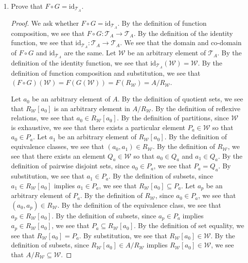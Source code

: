 \documentclass{amsart}
\newcommand{\id}[1]{\mathrm{id}_{#1}}
\newcommand{\W}{\mathcal{W}}
\newcommand{\T}{\mathcal{T}}
\numberwithin{equation}{section}
\begin{document}
\begin{problem}[manual-num=56]
\begin{enumerate}
			\item
			Prove that $F \circ G = \id{\T_A}$.

			\begin{proof}
				We ask whether $F \circ G = \id{\T_A}$.
				By the definition of function composition, we see that $F \circ G : \T_A \rightarrow \T_A$.
				By the definition of the identity function, we see that $\id{\T_A} : \T_A \rightarrow \T_A$.
				We see that the domain and co-domain of $F \circ G$ and $\id{\T_A}$ are the same.
				Let $\W$ be an arbitrary element of $\T_A$.
				By the definition of the identity function, we see that $\id{\T_A}(\W) = \W$.
				By the definition of function composition and substitution, we see that
				$(F \circ G)(\W) = F(G(\W)) = F(R_\W) = A / R_\W$.

				Let $a_0$ be an arbitrary element of $A$.
				By the definition of quotient sets, we see that $R_\W [a_0]$ is an arbitrary element in $A / R_\W$.
				By the definition of reflexive relations, we see that $a_0 \in R_\W [a_0]$.
				By the definition of partitions, since $\W$ is exhaustive, we see that there exists a particular element $P_a \in \W$ so that $a_0 \in P_a$.
				Let $a_1$ be an arbitrary element of $R_\W [a_0]$.
				By the definition of equivalence classes, we see that $(a_0, a_1) \in R_\W$.
				By the definition of $R_\W$, we see that there exists an element $Q_a \in \W$ so that $a_0 \in Q_a$ and $a_1 \in Q_a$.
				By the definition of pairwise disjoint sets, since $a_0 \in P_a$, we see that $P_a = Q_a$.
				By substitution, we see that $a_1 \in P_a$.
				By the definition of subsets, since $a_1 \in R_\W [a_0]$ implies $a_1 \in P_a$, we see that $R_\W [a_0] \subseteq P_a$.
				Let $a_p$ be an arbitrary element of $P_a$.
				By the definition of $R_\W$, since $a_0 \in P_a$, we see that $(a_0, a_p) \in R_\W$.
				By the definition of the equivalence class, we see that $a_p \in R_\W [a_0]$.
				By the definition of subsets, since $a_p \in P_a$ implies $a_p \in R_\W [a_0]$, we see that $P_a \subseteq R_\W [a_0]$.
				By the definition of set equality, we see that $R_\W [a_0] = P_a$.
				By substitution, we see that $R_\W [a_0] \in \W$.
				By the definition of subsets, since $R_\W [a_0] \in A / R_\W$ implies $R_\W [a_0] \in \W$, we see that $A / R_\W \subseteq \W$.


\end{proof}
\end{enumerate}
\end{problem}
\end{document}
